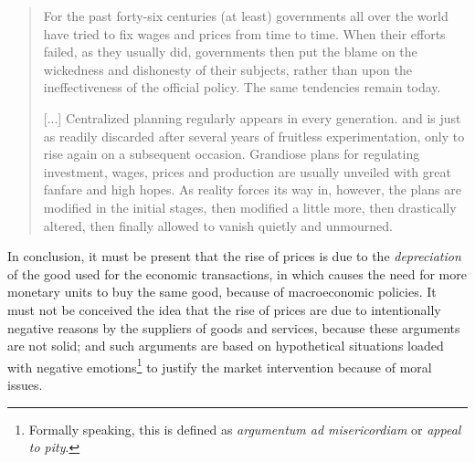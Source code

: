 \documentclass[12pt,a4paper,twoside]{book}
\begin{document}
\begin{quotation}
For the past forty-six centuries (at least) governments all over the world have tried to fix wages and prices from time to time. When their efforts failed, as they usually did, governments then put the blame on the wickedness and dishonesty of their subjects, rather than upon the ineffectiveness of the official policy. The same tendencies remain today.

[...] Centralized planning regularly appears in every generation. and is just as readily discarded after several years of fruitless experimentation, only to rise again on a subsequent occasion. Grandiose plans for regulating investment, wages, prices and production are usually unveiled with great fanfare and high hopes. As reality forces its way in, however, the plans are modified in the initial stages, then modified a little more, then drastically altered, then finally allowed to vanish quietly and unmourned. \cite[9]{fortycenturies}
\end{quotation}

In conclusion, it must be present that the rise of prices is due to the \textit{depreciation} of the good used for the economic transactions, in which causes the need for more monetary units to buy the same good, because of macroeconomic policies. It must not be conceived the idea that the rise of prices are due to intentionally negative reasons by the suppliers of goods and services, because these arguments are not solid; and such arguments are based on hypothetical situations loaded with negative emotions\footnote{Formally speaking, this is defined as \textit{argumentum ad misericordiam} or \textit{appeal to pity}.} to justify the market intervention because of moral issues.




\end{document}
